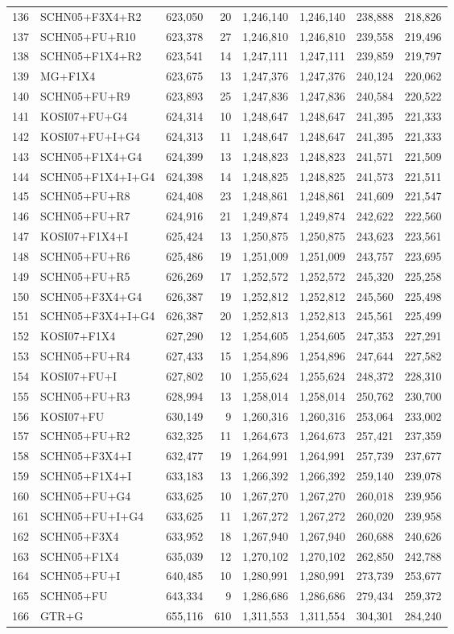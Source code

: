 \begin{longtable}{rlrrrrrr}
136&SCHN05+F3X4+R2&623,050&20&1,246,140&1,246,140&238,888&218,826\\
137&SCHN05+FU+R10&623,378&27&1,246,810&1,246,810&239,558&219,496\\
138&SCHN05+F1X4+R2&623,541&14&1,247,111&1,247,111&239,859&219,797\\
139&MG+F1X4&623,675&13&1,247,376&1,247,376&240,124&220,062\\
140&SCHN05+FU+R9&623,893&25&1,247,836&1,247,836&240,584&220,522\\
141&KOSI07+FU+G4&624,314&10&1,248,647&1,248,647&241,395&221,333\\
142&KOSI07+FU+I+G4&624,313&11&1,248,647&1,248,647&241,395&221,333\\
143&SCHN05+F1X4+G4&624,399&13&1,248,823&1,248,823&241,571&221,509\\
144&SCHN05+F1X4+I+G4&624,398&14&1,248,825&1,248,825&241,573&221,511\\
145&SCHN05+FU+R8&624,408&23&1,248,861&1,248,861&241,609&221,547\\
146&SCHN05+FU+R7&624,916&21&1,249,874&1,249,874&242,622&222,560\\
147&KOSI07+F1X4+I&625,424&13&1,250,875&1,250,875&243,623&223,561\\
148&SCHN05+FU+R6&625,486&19&1,251,009&1,251,009&243,757&223,695\\
149&SCHN05+FU+R5&626,269&17&1,252,572&1,252,572&245,320&225,258\\
150&SCHN05+F3X4+G4&626,387&19&1,252,812&1,252,812&245,560&225,498\\
151&SCHN05+F3X4+I+G4&626,387&20&1,252,813&1,252,813&245,561&225,499\\
152&KOSI07+F1X4&627,290&12&1,254,605&1,254,605&247,353&227,291\\
153&SCHN05+FU+R4&627,433&15&1,254,896&1,254,896&247,644&227,582\\
154&KOSI07+FU+I&627,802&10&1,255,624&1,255,624&248,372&228,310\\
155&SCHN05+FU+R3&628,994&13&1,258,014&1,258,014&250,762&230,700\\
156&KOSI07+FU&630,149&9&1,260,316&1,260,316&253,064&233,002\\
157&SCHN05+FU+R2&632,325&11&1,264,673&1,264,673&257,421&237,359\\
158&SCHN05+F3X4+I&632,477&19&1,264,991&1,264,991&257,739&237,677\\
159&SCHN05+F1X4+I&633,183&13&1,266,392&1,266,392&259,140&239,078\\
160&SCHN05+FU+G4&633,625&10&1,267,270&1,267,270&260,018&239,956\\
161&SCHN05+FU+I+G4&633,625&11&1,267,272&1,267,272&260,020&239,958\\
162&SCHN05+F3X4&633,952&18&1,267,940&1,267,940&260,688&240,626\\
163&SCHN05+F1X4&635,039&12&1,270,102&1,270,102&262,850&242,788\\
164&SCHN05+FU+I&640,485&10&1,280,991&1,280,991&273,739&253,677\\
165&SCHN05+FU&643,334&9&1,286,686&1,286,686&279,434&259,372\\
166&GTR+G&655,116&610&1,311,553&1,311,554&304,301&284,240
\end{longtable}

